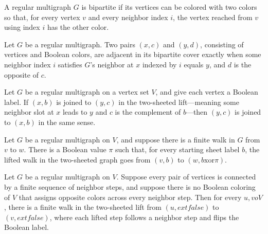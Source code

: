 \begin{definition}
\label{Randomized.RegularMultigraph.IsBipartite}
\leanok
A regular multigraph $G$ is bipartite if its vertices can be colored with two colors so
that, for every vertex $v$ and every neighbor index $i$, the vertex reached from $v$
using index $i$ has the other color.
\end{definition}

\begin{definition}
\label{Randomized.RegularMultigraph.coverAdj}
\leanok
Let $G$ be a regular multigraph. Two pairs $(x,c)$ and $(y,d)$, consisting of vertices
and Boolean colors, are adjacent in its bipartite cover exactly when some neighbor index
$i$ satisfies $G$'s neighbor at $x$ indexed by $i$ equals $y$, and $d$ is the opposite
of $c$.
\end{definition}

\begin{theorem}
\label{Randomized.RegularMultigraph.coverAdj_symm}
\leanok
{}
Let $G$ be a regular multigraph on a vertex set $V$, and give each vertex a Boolean
label. If $(x,b)$ is joined to $(y,c)$ in the two-sheeted lift—meaning some neighbor
slot at $x$ leads to $y$ and $c$ is the complement of $b$—then $(y,c)$ is joined to
$(x,b)$ in the same sense.
\end{theorem}

\begin{theorem}
\label{Randomized.RegularMultigraph.cover_lift}
\leanok
{}
Let $G$ be a regular multigraph on $V$, and suppose there is a finite walk in $G$ from
$v$ to $w$. There is a Boolean value $\pi$ such that, for every starting sheet label
$b$, the lifted walk in the two-sheeted graph goes from $(v,b)$ to
$(w,b\mathbin{\mathrm{xor}}\pi)$.
\end{theorem}

\begin{theorem}
\label{Randomized.RegularMultigraph.cover_reach}
\leanok
{}
Let $G$ be a regular multigraph on $V$. Suppose every pair of vertices is connected by a
finite sequence of neighbor steps, and suppose there is no Boolean coloring of $V$ that
assigns opposite colors across every neighbor step. Then for every $u,v	o V$, there is a
finite walk in the two-sheeted lift from $(u,	ext{false})$ to $(v,	ext{false})$, where
each lifted step follows a neighbor step and flips the Boolean label.
\end{theorem}

